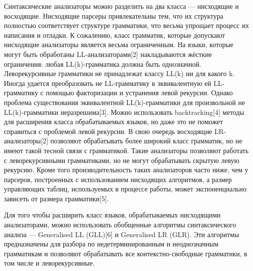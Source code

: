 Синтаксические анализаторы можно разделить на два класса --- нисходящие и восходящие. Нисходящие парсеры привлекательны тем, что их структура полностью соответствует структуре грамматики, что весьма упрощает процесс их написания и отладки. К сожалению, класс грамматик, которые допускают нисходящие анализаторы является весьма ограниченным. На языки, которые могут быть обработаны LL-анализаторами[2] накладываются жёсткие ограничения: любая LL(k)-грамматика должна быть однозначной. Леворекурсивные  грамматики не принадлежат классу LL(k) ни для  какого  k. Иногда удается преобразовать не LL-грамматику в эквивалентную ей LL-грамматику с  помощью факторизации  и устранения левой рекурсии. Однако  проблема  существования эквивалентной LL(k)-грамматики для произвольной  не LL(k)-грамматики неразрешима[3]. Можно использовать backtracking[4] методы для расширения класса обрабатываемых языков, но даже это не поможет справиться с проблемой левой рекурсии. В свою очередь восходящие LR-анализаторы[2] позволяют обрабатывать более широкий класс грамматик, но не имеют такой тесной связи с грамматикой. Такие анализаторы позволяют работать с леворекурсивными грамматиками, но не могут обрабатывать скрытую левую рекурсию. Кроме того производительность таких анализаторов часто ниже, чем у парсеров, построенных с использованием нисходящих алгоритмов, а размер управляющих таблиц, используемых в процессе работы, может экспоненциально зависеть от размера грамматики[5].

Для того чтобы расширить класс языков, обрабатываемых нисходящими анализаторами, можно использовать обобщенные алгоритмы синтаксического анализа --- Generalised LL (GLL)[6] и Generalised LR (GLR). Эти алгоритмы предназначены для разбора по недетерминированным и неоднозначным грамматикам и позволяют обрабатывать все контекстно-свободные грамматики, в том числе и леворекурсивные. 


